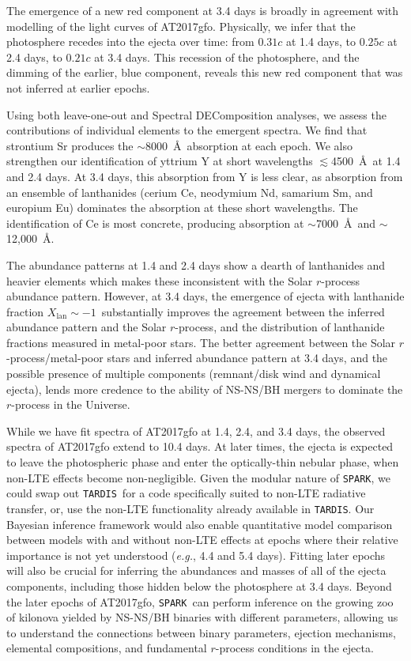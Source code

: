 \documentclass[twocolumn,twocolappendix]{aastex63}
\def\SPARK{\texttt{SPARK}}
\def\TARDIS{\texttt{TARDIS}}
\def\eg{{\it e.g.}}
\begin{document}
{The emergence of a new red component at 3.4 days is broadly in agreement with modelling of the light curves of AT2017gfo. Physically, we infer that the photosphere recedes into the ejecta over time: from $0.31c$ at 1.4 days, to $0.25c$ at 2.4 days, to $0.21c$ at 3.4 days. This recession of the photosphere, and the dimming of the earlier, blue component, reveals this new red component that was not inferred at earlier epochs. 

Using both leave-one-out and Spectral DEComposition analyses, we assess the contributions of individual elements to the emergent spectra. We find that strontium Sr produces the $\sim$8000~\AA~absorption at each epoch. We also strengthen our identification of yttrium Y at short wavelengths $\lesssim$4500~\AA~at 1.4 and 2.4 days. At 3.4 days, this absorption from Y is less clear, as absorption from an ensemble of lanthanides (cerium Ce, neodymium Nd, samarium Sm, and europium Eu) dominates the absorption at these short wavelengths. The identification of Ce is most concrete, producing absorption at $\sim$7000~\AA~and $\sim$12,000~\AA.

The abundance patterns at 1.4 and 2.4 days show a dearth of lanthanides and heavier elements which makes these inconsistent with the Solar $r$-process abundance pattern. However, at 3.4 days, the emergence of ejecta with lanthanide fraction $X_{\mathrm{lan}} \sim -1$~substantially improves the agreement between the inferred abundance pattern and the Solar $r$-process, and the distribution of lanthanide fractions measured in metal-poor stars. The better agreement between the Solar $r$-process/metal-poor stars and inferred abundance pattern at 3.4 days, and the possible presence of multiple components (remnant/disk wind and dynamical ejecta), lends more credence to the ability of NS-NS/BH mergers to dominate the $r$-process in the Universe. 

While we have fit spectra of AT2017gfo at 1.4, 2.4, and 3.4 days, the observed spectra of AT2017gfo extend to 10.4 days. At later times, the ejecta is expected to leave the photospheric phase and enter the optically-thin nebular phase, when non-LTE effects become non-negligible. Given the modular nature of \SPARK, we could swap out \TARDIS~for a code specifically suited to non-LTE radiative transfer, or, use the non-LTE functionality already available in \TARDIS. Our Bayesian inference framework would also enable quantitative model comparison between models with and without non-LTE effects at epochs where their relative importance is not yet understood (\eg, 4.4 and 5.4 days). Fitting later epochs will also be crucial for inferring the abundances and masses of all of the ejecta components, including those hidden below the photosphere at 3.4 days. Beyond the later epochs of AT2017gfo, \SPARK~can perform inference on the growing zoo of kilonova yielded by NS-NS/BH binaries with different parameters, allowing us to understand the connections between binary parameters, ejection mechanisms, elemental compositions, and fundamental $r$-process conditions in the ejecta. 


}
\end{document}
